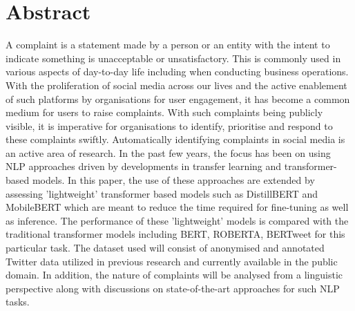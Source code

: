 \chapter*{\Large \center Abstract}

A complaint is a statement made by a person or an entity with the intent to indicate something is unacceptable or unsatisfactory. This is commonly used in various aspects of day-to-day life including when conducting business operations. With the proliferation of social media across our lives and the active enablement of such platforms by organisations for user engagement, it has become a common medium for users to raise complaints. With such complaints being publicly visible, it is imperative for organisations to identify, prioritise and respond to these complaints swiftly. Automatically identifying complaints in social media is an active area of research. In the past few years, the focus has been on using NLP approaches driven by developments in transfer learning and transformer-based models.
\newline \newline
In this paper, the use of these approaches are extended by assessing 'lightweight' transformer based models such as DistillBERT and MobileBERT which are meant to reduce the time required for fine-tuning as well as inference. The performance of these 'lightweight' models is compared with the traditional transformer models including BERT, ROBERTA, BERTweet for this particular task. The dataset used will consist of anonymised and annotated Twitter data utilized in previous research and currently available in the public domain. In addition, the nature of complaints will be analysed from a linguistic perspective along with discussions on state-of-the-art approaches for such NLP tasks.